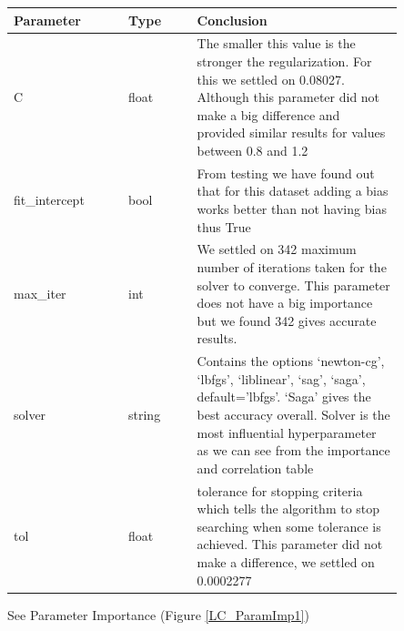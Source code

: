 \documentclass[11pt]{article}
\begin{document}
\begin{table}[ht]
  \centering
  \begin{tabular}{|p{0.25\linewidth} | p{0.15 \linewidth} | p{0.45\linewidth}|} 
    \hline
    \textbf{Parameter} & \textbf{Type} & \textbf{Conclusion} \\ \hline
    C & float & The smaller this value is the stronger the regularization. For this we settled on 0.08027. Although this parameter did not make a big difference and provided similar results for values between 0.8 and 1.2 \\ \hline
    fit\_intercept & bool & From testing we have found out that for this dataset adding a bias works better than not having bias thus True  \\ \hline
    max\_iter & int &  We settled on 342 maximum number of iterations taken for the solver to converge. This parameter does not have a big importance but we found 342 gives accurate results. \\ \hline
    solver & string & Contains the options ‘newton-cg’, ‘lbfgs’, ‘liblinear’, ‘sag’, ‘saga’, default=’lbfgs’. ‘Saga’ gives the best accuracy overall. Solver is the most influential hyperparameter as we can see from the importance and correlation table \\ \hline
    tol & float & tolerance for stopping criteria which tells the algorithm to stop searching when some tolerance is achieved. This parameter did not make a difference, we settled on 0.0002277 \\ \hline


  \end{tabular}
\end{table}\label{RF_Analysis_Table}
See Parameter Importance (Figure \ref{LC_ParamImp1})

\newpage
\end{document}
